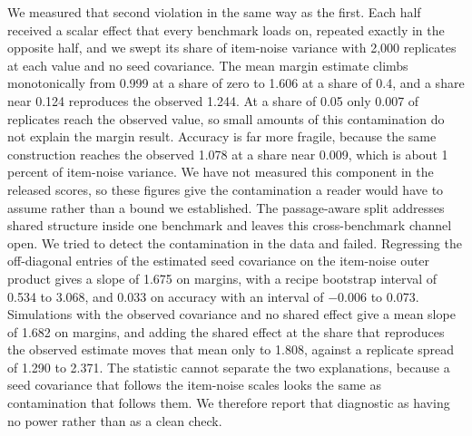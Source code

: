 We measured that second violation in the same way as the first. Each half received a scalar effect that every benchmark loads on, repeated exactly in the opposite half, and we swept its share of item-noise variance with 2,000 replicates at each value and no seed covariance. The mean margin estimate climbs monotonically from 0.999 at a share of zero to 1.606 at a share of 0.4, and a share near 0.124 reproduces the observed 1.244. At a share of 0.05 only 0.007 of replicates reach the observed value, so small amounts of this contamination do not explain the margin result. Accuracy is far more fragile, because the same construction reaches the observed 1.078 at a share near 0.009, which is about 1 percent of item-noise variance. We have not measured this component in the released scores, so these figures give the contamination a reader would have to assume rather than a bound we established. The passage-aware split addresses shared structure inside one benchmark and leaves this cross-benchmark channel open. We tried to detect the contamination in the data and failed. Regressing the off-diagonal entries of the estimated seed covariance on the item-noise outer product gives a slope of 1.675 on margins, with a recipe bootstrap interval of 0.534 to 3.068, and 0.033 on accuracy with an interval of $-0.006$ to 0.073. Simulations with the observed covariance and no shared effect give a mean slope of 1.682 on margins, and adding the shared effect at the share that reproduces the observed estimate moves that mean only to 1.808, against a replicate spread of 1.290 to 2.371. The statistic cannot separate the two explanations, because a seed covariance that follows the item-noise scales looks the same as contamination that follows them. We therefore report that diagnostic as having no power rather than as a clean check.

